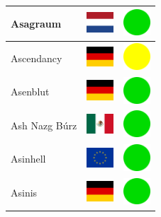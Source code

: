 \documentclass[12pt, a4paper, twoside]{report}
\begin{document}
\begin{center}
\begin{longtable}{|p{5cm}|p{2cm}|p{2cm}|}
 Asagraum                                                   & \includegraphics[width=1cm]{../4x3/nl} &   \includegraphics[width=1cm]{../likes/y} \\ \hline
 Ascendancy                                                 & \includegraphics[width=1cm]{../4x3/de} &   \includegraphics[width=1cm]{../likes/m} \\ \hline
 Asenblut                                                   & \includegraphics[width=1cm]{../4x3/de} &   \includegraphics[width=1cm]{../likes/y} \\ \hline
 Ash Nazg Búrz                                              & \includegraphics[width=1cm]{../4x3/mx} &   \includegraphics[width=1cm]{../likes/y} \\ \hline
 Asinhell                                                   & \includegraphics[width=1cm]{../4x3/eu} &   \includegraphics[width=1cm]{../likes/y} \\ \hline
 Asinis                                                     & \includegraphics[width=1cm]{../4x3/de} &   \includegraphics[width=1cm]{../likes/y} \\ \hline

\end{longtable}
\end{center}
\end{document}
